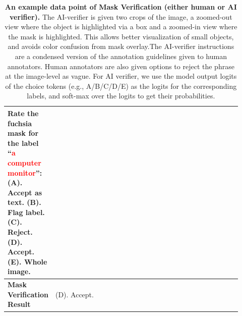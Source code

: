 \documentclass[]{fairmeta}
\begin{document}
\begin{table}[htbp!]
\begin{tabular}{|p{0.12\linewidth}|p{0.8\linewidth}|}
\begin{minipage}[t]{0.9\linewidth}
			Rate the fuchsia mask for the label ``\textcolor{red}{a computer monitor}'': (A). Accept as text. (B). Flag label. (C). Reject. (D). Accept. (E). Whole image. 
			\vspace{0.2em}
		\end{minipage}
		\\
		\hline
		\textbf{Mask \hspace{0.5\linewidth}Verification \hspace{0.5\linewidth}Result} & \vspace{0.2em} (D). Accept. \\
		\hline
	\end{tabular}
	\caption{\textbf{An example data point of Mask Verification (either human or AI verifier).} The AI-verifier is given two crops of the image, a zoomed-out view where the object is highlighted via a box and a zoomed-in view where the mask is highlighted. This allows better visualization of small objects, and avoids color confusion from mask overlay.The AI-verifier instructions are a condensed version of the annotation guidelines given to human annotators. Human annotators are also given options to reject the phrase at the image-level as vague. For AI verifier, we use the model output logits of the choice tokens (e.g., A/B/C/D/E) as the logits for the corresponding labels, and soft-max over the logits to get their probabilities.}
	\label{tab:mv_llamarater_exp}
    \vspace{10pt}
\end{table}
\end{document}
